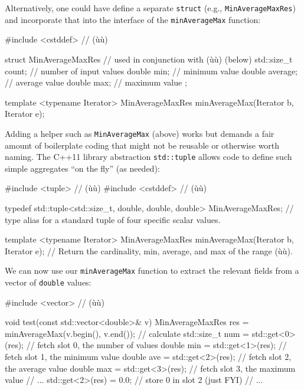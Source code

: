 \noindent Alternatively, one could have define a separate \lstinline!struct! (e.g.,
\lstinline!MinAverageMaxRes!) and incorporate that into the interface of
the \lstinline!minAverageMax! function:

\begin{emcppslisting}
#include <cstddef>  // (ù{}ù)

struct MinAverageMaxRes  // used in conjunction with (ù{}ù) (below)
{
    std::size_t count;  // number of input values
    double min;         // minimum value
    double average;     // average value
    double max;         // maximum value
};

template <typename Iterator>
MinAverageMaxRes minAverageMax(Iterator b, Iterator e);
\end{emcppslisting}
    

\noindent Adding a helper  such as \lstinline!MinAverageMax!
(above) works but demands a fair amount of boilerplate coding that might
not be reusable or otherwise worth naming. The C++11 library abstraction
\lstinline!std::tuple! allows code to define such simple aggregates ``on
the fly'' (as needed):

\begin{emcppslisting}[emcppsbatch=e5]
#include <tuple>    // (ù{}ù)
#include <cstddef>  // (ù{}ù)

typedef std::tuple<std::size_t, double, double, double> MinAverageMaxRes;
    // type alias for a standard tuple of four specific scalar values.

template <typename Iterator>
MinAverageMaxRes minAverageMax(Iterator b, Iterator e);
    // Return the cardinality, min, average, and max of the range (ù{\codeincomments{[b, e]}}ù).
\end{emcppslisting}
    

\noindent We can now use our \lstinline!minAverageMax! function to extract the
relevant fields from a vector of \lstinline!double! values:

\begin{emcppslisting}[emcppsbatch=e5]
#include <vector>  // (ù{}ù)

void test(const std::vector<double>& v)
{
    MinAverageMaxRes res = minAverageMax(v.begin(), v.end());  // calculate
    std::size_t num = std::get<0>(res);  // fetch slot 0, the number of values
    double      min = std::get<1>(res);  // fetch slot 1, the minimum value
    double      ave = std::get<2>(res);  // fetch slot 2, the average value
    double      max = std::get<3>(res);  // fetch slot 3, the maximum value
    // ...
    std::get<2>(res) = 0.0;              // store 0 in slot 2 (just FYI)
    // ...
}
\end{emcppslisting}
    

